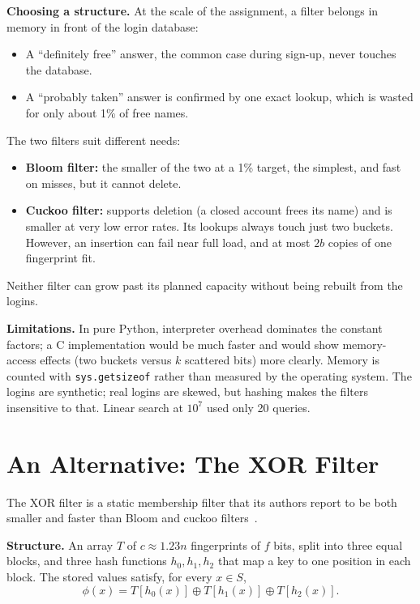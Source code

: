 \documentclass[acmsmall,nonacm]{acmart}
\newcommand{\code}[1]{\texttt{#1}}
\begin{document}
\textbf{Choosing a structure.} At the scale of the assignment, a filter belongs
in memory in front of the login database:
\begin{itemize}
  \item A ``definitely free'' answer, the common case during sign-up, never touches the database.
  \item A ``probably taken'' answer is confirmed by one exact lookup, which is wasted for only about 1\% of free names.
\end{itemize}
The two filters suit different needs:
\begin{itemize}
  \item \textbf{Bloom filter:} the smaller of the two at a 1\% target, the simplest, and fast on misses, but it cannot delete.
  \item \textbf{Cuckoo filter:} supports deletion (a closed account frees its name) and is smaller at very low error rates. Its lookups always touch just two buckets. However, an insertion can fail near full load, and at most $2b$ copies of one fingerprint fit.
\end{itemize}
Neither filter can grow past its planned capacity without being rebuilt from the
logins.

\textbf{Limitations.} In pure Python, interpreter overhead dominates the
constant factors; a C implementation would be much faster and would show
memory-access effects (two buckets versus $k$ scattered bits) more clearly.
Memory is counted with \code{sys.getsizeof} rather than measured by the
operating system. The logins are synthetic; real logins are skewed, but hashing
makes the filters insensitive to that. Linear search at $10^7$ used only 20
queries.

\section{An Alternative: The XOR Filter}
\label{sec:alternative}

The XOR filter is a static membership filter that its authors report to be
both smaller and faster than Bloom and cuckoo filters~\cite{graf2020}.

\textbf{Structure.} An array $T$ of $c \approx 1.23n$ fingerprints of $f$ bits,
split into three equal blocks, and three hash functions $h_0, h_1, h_2$ that map
a key to one position in each block. The stored values satisfy, for every
$x \in S$,
\begin{equation}
  \phi(x) = T[h_0(x)] \oplus T[h_1(x)] \oplus T[h_2(x)].
\end{equation}
\end{document}
